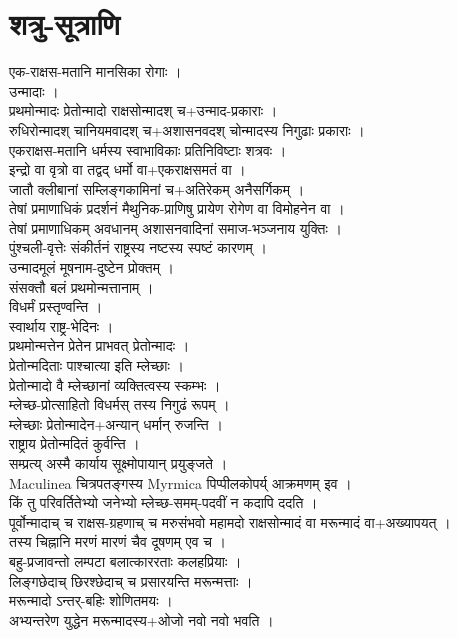 \documentclass[12pt]{article}
\begin{document}
\section {{\skt शत्रु-सूत्राणि
}}
{ \skt एक-राक्षस-मतानि मानसिका रोगाः ।\\
उन्मादाः ।\\
प्रथमोन्मादः प्रेतोन्मादो राक्षसोन्मादश् च+उन्माद-प्रकाराः ।\\
रुधिरोन्मादश् चानियमवादश् च+अशासनवदश् चोन्मादस्य निगुढाः प्रकाराः ।\\
एकराक्षस-मतानि धर्मस्य स्वाभाविकाः प्रतिनिविष्टाः शत्रवः ।\\
इन्द्रो वा वृत्रो वा तद्वद् धर्मो वा+एकराक्षसमतं वा ।\\
जातौ क्लीबानां सम्लिङ्गकामिनां च+अतिरेकम् अनैसर्गिकम् ।\\
तेषां प्रमाणाधिकं प्रदर्शनं मैथुनिक-प्राणिषु प्रायेण रोगेण वा विमोहनेन वा ।\\
तेषां प्रमाणाधिकम् अवधानम् अशासनवादिनां समाज-भञ्जनाय युक्तिः ।\\
पुंश्चली-वृत्तेः संकीर्तनं राष्ट्रस्य नष्टस्य स्पष्टं कारणम् ।\\
उन्मादमूलं मूषनाम-दुष्टेन प्रोक्तम् ।\\
संसक्तौ बलं प्रथमोन्मत्तानाम् ।\\
विधर्मं प्रस्तृण्वन्ति ।\\
स्वार्थाय राष्ट्र-भेदिनः ।\\
प्रथमोन्मत्तेन प्रेतेन प्राभवत् प्रेतोन्मादः ।\\
प्रेतोन्मदिताः पाश्चात्या इति म्लेच्छाः ।\\
प्रेतोन्मादो वै म्लेच्छानां व्यक्तित्वस्य स्कम्भः ।\\
म्लेच्छ-प्रोत्साहितो विधर्मस् तस्य निगुढं रूपम् ।\\
म्लेच्छाः प्रेतोन्मादेन+अन्यान् धर्मान् रुजन्ति ।\\
राष्ट्राय प्रेतोन्मदितं कुर्वन्ति ।\\
सम्प्रत्य् अस्मै कार्याय सूक्ष्मोपायान् प्रयुङ्जते ।\\
Maculinea चित्रपतङ्गस्य Myrmica पिप्पीलकोपर्य् आक्रमणम् इव ।\\
किं तु परिवर्तितेभ्यो जनेभ्यो म्लेच्छ-समम्-पदवीं न कदापि ददति ।\\
पूर्वोन्मादाच् च राक्षस-ग्रहणाच् च मरुसंभवो महामदो राक्षसोन्मादं वा मरून्मादं वा+अख्यापयत् ।\\
तस्य चिह्नानि मरणं मारणं चैव दूषणम् एव च ।\\
बहु-प्रजावन्तो लम्पटा बलात्काररताः कलहप्रियाः ।\\
लिङ्गछेदाच् छिरश्छेदाच् च प्रसारयन्ति मरून्मत्ताः ।\\
मरून्मादो ऽन्तर्-बहिः शोणितमयः ।\\
अभ्यन्तरेण युद्धेन मरून्मादस्य+ओजो नवो नवो भवति ।\\
}
\end{document}
